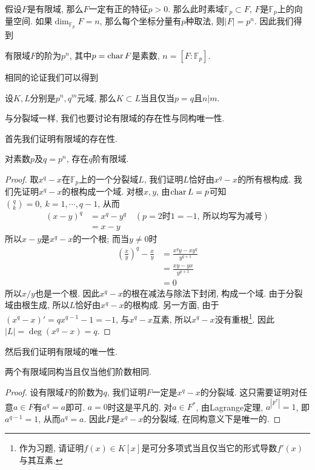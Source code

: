 假设$F$是有限域, 那么$F$一定有正的特征$p>0$.
那么此时素域$\mathbb{F}_p\subset F$, $F$是$\mathbb{F}_p$上的向量空间.
如果$\dim_{\mathbb{F}_p}F=n$, 那么每个坐标分量有$p$种取法, 则$|F|=p^n$.
因此我们得到
\begin{prop}
    有限域$F$的阶为$p^n$, 其中$p=\operatorname{char}{F}$是素数, $n=[F:\mathbb{F}_p]$.
\end{prop}

相同的论证我们可以得到
\begin{prop}\label{finite subfield}
    设$K,L$分别是$p^n,q^m$元域, 那么$K\subset L$当且仅当$p=q$且$n|m$.
\end{prop}

与分裂域一样, 我们也要讨论有限域的存在性与同构唯一性.

首先我们证明有限域的存在性.
\begin{thm}
    对素数$p$及$q=p^n$, 存在$q$阶有限域.
\end{thm}
\begin{proof}
    取$x^q-x$在$\mathbb{F}_p$上的一个分裂域$L$, 我们证明$L$恰好由$x^q-x$的所有根构成.
    我们先证明$x^q-x$的根构成一个域.
    对根$x,y$, 由$\operatorname{char} L=p$可知$\binom{q}{k}=0,\ k=1,\cdots,q-1$, 从而
    \begin{align*}
        (x-y)^q&=x^q-y^q\quad(p=2\text{时}1=-1,\ \text{所以均写为减号})\\
        &=x-y
    \end{align*}
    所以$x-y$是$x^q-x$的一个根;
    而当$y\neq 0$时
    \begin{align*}
        \left(\frac{x}{y}\right)^q-\frac{x}{y}&=\frac{x^qy-xy^q}{y^{q+1}}\\
        &=\frac{xy-yx}{y^{q+1}}\\
        &=0
    \end{align*}
    所以$x/y$也是一个根.
    因此$x^q-x$的根在减法与除法下封闭, 构成一个域.
    由于分裂域由根生成, 所以$L$恰好由$x^q-x$的根构成.
    另一方面, 由于$(x^q-x)'=qx^{q-1}-1=-1$, 与$x^q-x$互素, 所以$x^q-x$没有重根\footnote{作为习题, 请证明$f(x)\in K[x]$是可分多项式当且仅当它的形式导数$f'(x)$与其互素.}.
    因此$|L|=\deg(x^q-x)=q$.
\end{proof}

然后我们证明有限域的唯一性.
\begin{thm}
    两个有限域同构当且仅当他们阶数相同.
\end{thm}
\begin{proof}
    设有限域$F$的阶数为$q$, 我们证明$F$一定是$x^q-x$的分裂域.
    这只需要证明对任意$a\in F$有$a^q=a$即可.
    $a=0$时这是平凡的.
    对$a\in F^*$, 由Lagrange定理, $a^{|F^*|}=1$, 即$a^{q-1}=1$, 从而$a^q=a$.
    因此$F$是$x^q-x$的分裂域, 在同构意义下是唯一的.
\end{proof}


